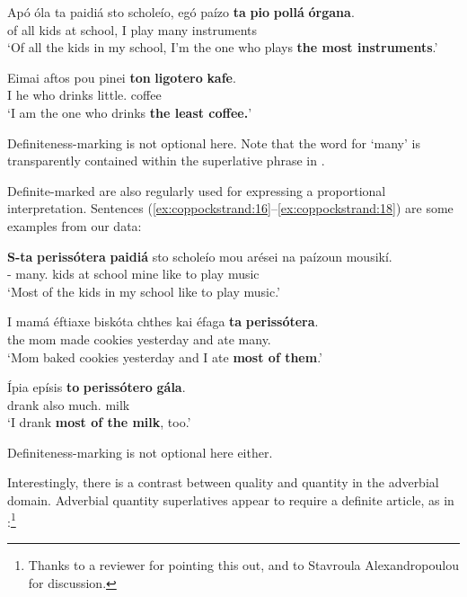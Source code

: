 \documentclass[output=paper
,modfonts
,nonflat]{langsci/langscibook}
\begin{document}
\ea \label{ex:coppockstrand:14}
\gll Apó óla ta paidiá sto scholeío, egó paízo \textbf{ta} \textbf{pio} \textbf{pollá} \textbf{órgana}.\\
of all   kids at school, I play  \cmpr{} many instruments\\
\glt `Of all the kids in my school, I'm the one who plays \textbf{the most instruments}.'
\z

\ea \label{ex:coppockstrand:15}
\gll Eimai aftos pou pinei \textbf{ton}  \textbf{ligotero} \textbf{kafe}.\\
I he who drinks  little.\cmpr{} coffee\\
\glt `I am the one who drinks \textbf{the least coffee.}'
\z

Definiteness-marking is not optional here. Note that the word for `many' is transparently contained within the superlative phrase in .

Definite-marked  are also regularly used for expressing a proportional interpretation. Sentences (\ref{ex:coppockstrand:16}--\ref{ex:coppockstrand:18}) are some examples from our data:

\ea \label{ex:coppockstrand:16}
\gll \textbf{S-ta} \textbf{perissótera} \textbf{paidiá} sto scholeío mou arései na paízoun mousikí.\\
\dat- many.\cmpr{} kids at school mine like to play music\\ 
\glt `Most of the kids in my school like to play music.'
\z


\ea \label{ex:coppockstrand:17}
\gll I mamá éftiaxe biskóta chthes kai éfaga \textbf{ta} \textbf{perissótera}.\\
the mom made cookies yesterday and ate  many.\cmpr{}\\
\glt `Mom baked cookies yesterday and I ate \textbf{most of them}.'
\z


\ea \label{ex:coppockstrand:18}
\gll Ípia epísis \textbf{to} \textbf{perissótero} \textbf{gála}.\\
drank also  much.\cmpr{} milk\\
\glt `I drank \textbf{most of the milk}, too.'
\z

Definiteness-marking is not optional here either.

Interestingly, there is a contrast between quality and quantity in the adverbial domain. Adverbial quantity superlatives appear to require a definite article, as in :\footnote{Thanks to a reviewer for pointing this out, and to Stavroula Alexandropoulou for discussion.}
\end{document}

